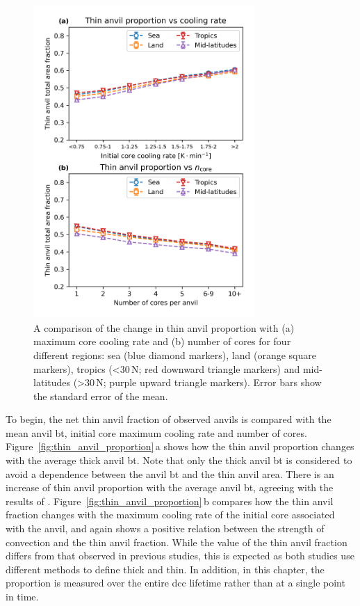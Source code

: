\begin{figure}[tp]
    \centering
    \includegraphics[width=0.75\textwidth]{figures/chapter3_05.png}
    \caption[
    A comparison of the change in thin anvil proportion with maximum core cooling rate and number of cores for four different regions
    ]{
    A comparison of the change in thin anvil proportion with (a) maximum core cooling rate and (b) number of cores for four different regions: sea (blue diamond markers), land (orange square markers), tropics (\textless 30\,\textdegree N; red downward triangle markers) and mid-latitudes (\textgreater 30\,\textdegree N; purple upward triangle markers). Error bars show the standard error of the mean.
    }
    \label{fig:regional_thin_anvil_proportion}
\end{figure}

To begin, the net thin anvil fraction of observed anvils is compared with the mean anvil \acrshort{bt}, initial core maximum cooling rate and number of cores.
Figure~\ref{fig:thin_anvil_proportion}\,a shows how the thin anvil proportion changes with the average thick anvil \acrshort{bt}.
Note that only the thick anvil \acrshort{bt} is considered to avoid a dependence between the anvil \acrshort{bt} and the thin anvil area.
There is an increase of thin anvil proportion with the average anvil \acrshort{bt}, agreeing with the results of \citet{protopapadaki_upper_2017}.
Figure~\ref{fig:thin_anvil_proportion}\,b compares how the thin anvil fraction changes with the maximum cooling rate of the initial core associated with the anvil, and again shows a positive relation between the strength of convection and the thin anvil fraction.
While the value of the thin anvil fraction differs from that observed in previous studies, this is expected as both studies use different methods to define thick and thin.
In addition, in this chapter, the proportion is measured over the entire \acrshort{dcc} lifetime rather than at a single point in time.


